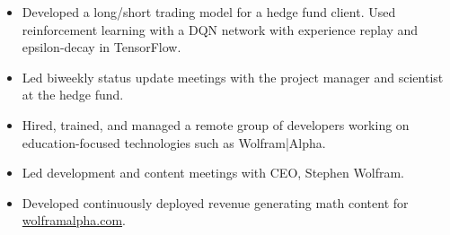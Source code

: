 \documentclass[11pt,a4paper,unicode]{moderncv}
\begin{document}
\vspace{-.1cm}
\cvline{}
{\begin{itemize} 
	  \item Developed a long/short trading model for a hedge fund client. Used reinforcement learning with a DQN network with experience replay and epsilon-decay in TensorFlow. 
	  \item Led biweekly status update meetings with the project manager and scientist at the hedge fund.
\end{itemize}}
\vspace{-.5cm}


\vspace{-.1cm}
\cvline{}
{\begin{itemize} 
	  \item Hired, trained, and managed a remote group of developers working on education-focused technologies such as Wolfram|Alpha. 
	  \item Led development and content meetings with CEO, Stephen Wolfram.
 \end{itemize}}
\vspace{-.5cm}


\vspace{-.1cm}
\cvline{}
{\begin{itemize} 
	\item Developed continuously deployed revenue generating math content for \url{wolframalpha.com}.
\end{itemize}}
\vspace{-.5cm}
\end{document}

